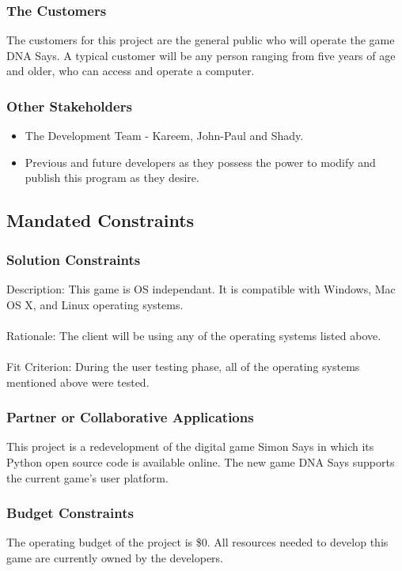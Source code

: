 \documentclass[12pt, titlepage]{article}
\begin{document}
\subsubsection{The Customers}
The customers for this project are the general public who will operate the game DNA Says. A typical customer will be any person ranging from five years of age and older, who can access and operate a computer. 

\subsubsection{Other Stakeholders}
\begin{itemize}
\item The Development Team - Kareem, John-Paul and Shady.
\item Previous and future developers as they possess the power to modify and publish this program as they desire.
\end{itemize}

\subsection{Mandated Constraints}

\subsubsection{Solution Constraints}
Description: This game is OS independant. It is compatible with Windows, Mac OS X, and Linux operating systems.\\
\\
Rationale: The client will be using any of the operating systems listed above.\\
\\
Fit Criterion: During the user testing phase, all of the operating systems mentioned above were tested.

\subsubsection{Partner or Collaborative Applications}
This project is a redevelopment of the digital game Simon Says in which its Python open source code is available online. The new game DNA Says supports the current game's user platform.

\subsubsection{Budget Constraints}
The operating budget of the project is \$0. All resources needed to develop this game are currently owned by the developers.
\end{document}
